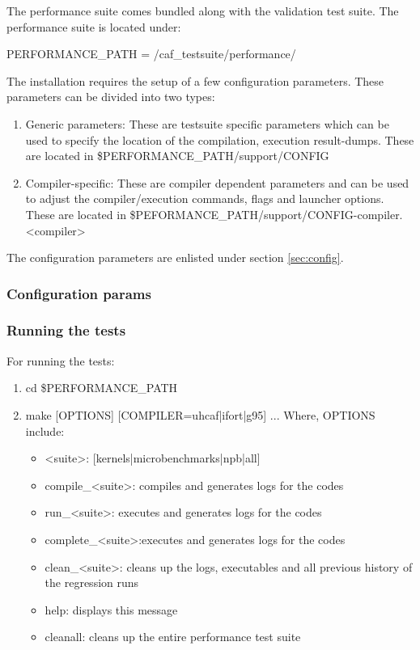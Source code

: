The performance suite comes bundled along with the validation test suite. The performance suite is located under: 

PERFORMANCE\_PATH = /caf\_testsuite/performance/

The installation requires the setup of a few configuration parameters. These parameters can be divided into two types:
\begin{enumerate}
\item Generic parameters: These are testsuite specific parameters which can be used to specify the location of the compilation, execution result-dumps. These are located in \$PERFORMANCE\_PATH/support/CONFIG
\item Compiler-specific: These are compiler dependent parameters and can be used to adjust the compiler/execution commands, flags and launcher options. These are located in \$PEFORMANCE\_PATH/support/CONFIG-compiler.<compiler>
\end{enumerate}

The configuration parameters are enlisted under section \ref{sec:config}.

\subsubsection{Configuration params}


\subsubsection{Running the tests}
For running the tests:
\begin{enumerate}
\item cd \$PERFORMANCE\_PATH
\item make [OPTIONS] [COMPILER=uhcaf|ifort|g95] ...
 Where, OPTIONS include:
 \begin{itemize}
 \item <suite>:          [kernels|microbenchmarks|npb|all]
 \item compile\_<suite>: compiles and generates logs for the codes
 \item run\_<suite>:     executes and generates logs for the codes
 \item complete\_<suite>:executes and generates logs for the codes
 \item clean\_<suite>:   cleans up the logs, executables and all previous history of the regression runs
 \item help:             displays this message
 \item cleanall:         cleans up the entire performance test suite
 \end{itemize}
\end{enumerate}


